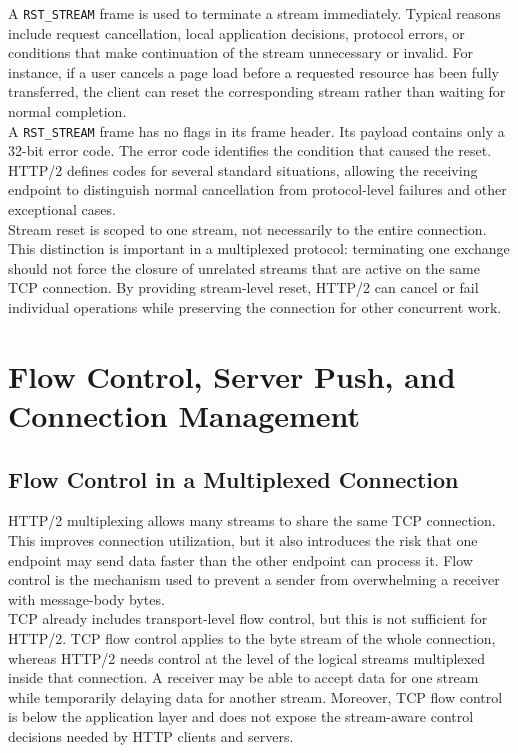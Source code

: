 \documentclass{scrbook}
\begin{document}
A \texttt{RST\_STREAM} frame is used to terminate a stream immediately. Typical reasons include request cancellation, local application decisions, protocol errors, or conditions that make continuation of the stream unnecessary or invalid. For instance, if a user cancels a page load before a requested resource has been fully transferred, the client can reset the corresponding stream rather than waiting for normal completion.\\

A \texttt{RST\_STREAM} frame has no flags in its frame header. Its payload contains only a 32-bit error code. The error code identifies the condition that caused the reset. HTTP/2 defines codes for several standard situations, allowing the receiving endpoint to distinguish normal cancellation from protocol-level failures and other exceptional cases.\\

Stream reset is scoped to one stream, not necessarily to the entire connection. This distinction is important in a multiplexed protocol: terminating one exchange should not force the closure of unrelated streams that are active on the same TCP connection. By providing stream-level reset, HTTP/2 can cancel or fail individual operations while preserving the connection for other concurrent work.

\chapter{Flow Control, Server Push, and Connection Management}

\section{Flow Control in a Multiplexed Connection}

HTTP/2 multiplexing allows many streams to share the same TCP connection. This improves connection utilization, but it also introduces the risk that one endpoint may send data faster than the other endpoint can process it. Flow control is the mechanism used to prevent a sender from overwhelming a receiver with message-body bytes.\\

TCP already includes transport-level flow control, but this is not sufficient for HTTP/2. TCP flow control applies to the byte stream of the whole connection, whereas HTTP/2 needs control at the level of the logical streams multiplexed inside that connection. A receiver may be able to accept data for one stream while temporarily delaying data for another stream. Moreover, TCP flow control is below the application layer and does not expose the stream-aware control decisions needed by HTTP clients and servers.\\
\end{document}
